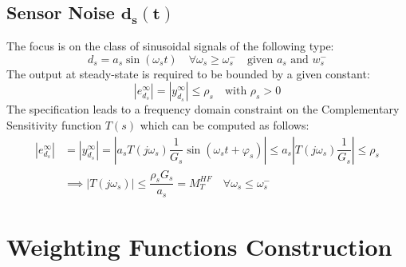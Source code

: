 \documentclass{article}
\numberwithin{equation}{subsection}
\begin{document}
	\subsection{Sensor Noise $\boldsymbol{d_s(t)}$}
	The focus is on the class of sinusoidal signals of the following type:
	\begin{equation}
		d_s = a_s\sin(\omega_st) \quad \forall\omega_s\geq\omega_s^- \quad \text{given } a_s \text{ and } w_s^-
	\end{equation}
	The output at steady-state is required to be bounded by a given constant:
	\begin{equation}
		\left| e_{d_s}^\infty \right| = \left| y_{d_s}^\infty \right| \leq \rho_s \quad \text{with } \rho_s>0
	\end{equation}
	The specification leads to a frequency domain constraint on the Complementary Sensitivity function $T(s)$ which can be computed as follows:
	\begin{align}
		\left| e_{d_s}^\infty \right| &= \left| y_{d_s}^\infty \right| = \left| a_sT(j\omega_s)\dfrac{1}{G_s}\sin(\omega_st+\varphi_s) \right| \leq a_s\left|T(j\omega_s)\dfrac{1}{G_s}\right| \leq \rho_s \nonumber \\
		&\implies \left|T(j\omega_s)\right| \leq \dfrac{\rho_sG_s}{a_s} = M_T^{HF} \quad \forall\omega_s \leq \omega_s^-
	\end{align}
	
	
	\section{Weighting Functions Construction}
\end{document}
